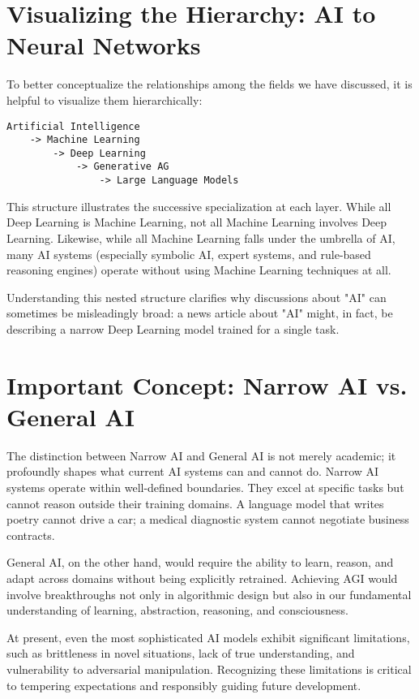 \documentclass{book}
\begin{document}
\section{Visualizing the Hierarchy: AI to Neural Networks}

To better conceptualize the relationships among the fields we have discussed, 
it is helpful to visualize them hierarchically:

\begin{verbatim}
Artificial Intelligence
    -> Machine Learning
        -> Deep Learning
            -> Generative AG
                -> Large Language Models
\end{verbatim}

This structure illustrates the successive specialization at each layer. 
While all Deep Learning is Machine Learning, not all Machine Learning involves 
Deep Learning. Likewise, while all Machine Learning falls under the umbrella of 
AI, many AI systems (especially symbolic AI, expert systems, and rule-based 
reasoning engines) operate without using Machine Learning techniques at all.

Understanding this nested structure clarifies why discussions about "AI" can 
sometimes be misleadingly broad: a news article about "AI" might, in fact, be 
describing a narrow Deep Learning model trained for a single task.

\section{Important Concept: Narrow AI vs. General AI}

The distinction between Narrow AI and General AI is not merely academic; it 
profoundly shapes what current AI systems can and cannot do. Narrow AI systems 
operate within well-defined boundaries. They excel at specific tasks but cannot 
reason outside their training domains. A language model that writes poetry 
cannot drive a car; a medical diagnostic system cannot negotiate business 
contracts.

General AI, on the other hand, would require the ability to learn, reason, and 
adapt across domains without being explicitly retrained. Achieving AGI would 
involve breakthroughs not only in algorithmic design but also in our fundamental 
understanding of learning, abstraction, reasoning, and consciousness.

At present, even the most sophisticated AI models exhibit significant 
limitations, such as brittleness in novel situations, lack of true 
understanding, and vulnerability to adversarial manipulation. Recognizing these 
limitations is critical to tempering expectations and responsibly guiding 
future development.
\end{document}
